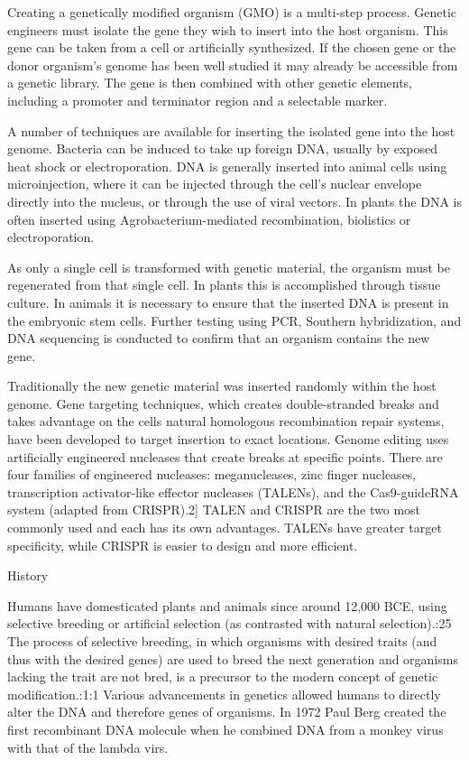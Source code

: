 Creating a genetically modified organism (GMO) is a multi-step process. Genetic engineers must isolate the gene they wish to insert into the host organism. This gene can be taken from a cell or artificially synthesized. If the chosen gene or the donor organism's genome has been well studied it may already be accessible from a genetic library. The gene is then combined with other genetic elements, including a promoter and terminator region and a selectable marker.

A number of techniques are available for inserting the isolated gene into the host genome. Bacteria can be induced to take up foreign DNA, usually by exposed heat shock or electroporation. DNA is generally inserted into animal cells using microinjection, where it can be injected through the cell's nuclear envelope directly into the nucleus, or through the use of viral vectors. In plants the DNA is often inserted using Agrobacterium-mediated recombination, biolistics or electroporation.

As only a single cell is transformed with genetic material, the organism must be regenerated from that single cell. In plants this is accomplished through tissue culture. In animals it is necessary to ensure that the inserted DNA is present in the embryonic stem cells. Further testing using PCR, Southern hybridization, and DNA sequencing is conducted to confirm that an organism contains the new gene.

Traditionally the new genetic material was inserted randomly within the host genome. Gene targeting techniques, which creates double-stranded breaks and takes advantage on the cells natural homologous recombination repair systems, have been developed to target insertion to exact locations. Genome editing uses artificially engineered nucleases that create breaks at specific points. There are four families of engineered nucleases: meganucleases, zinc finger nucleases, transcription activator-like effector nucleases (TALENs), and the Cas9-guideRNA system (adapted from CRISPR).2{]} TALEN and CRISPR are the two most commonly used and each has its own advantages. TALENs have greater target specificity, while CRISPR is easier to design and more efficient.

History

Humans have domesticated plants and animals since around 12,000 BCE, using selective breeding or artificial selection (as contrasted with natural selection).:25 The process of selective breeding, in which organisms with desired traits (and thus with the desired genes) are used to breed the next generation and organisms lacking the trait are not bred, is a precursor to the modern concept of genetic modification.:1:1 Various advancements in genetics allowed humans to directly alter the DNA and therefore genes of organisms. In 1972 Paul Berg created the first recombinant DNA molecule when he combined DNA from a monkey virus with that of the lambda virs.


